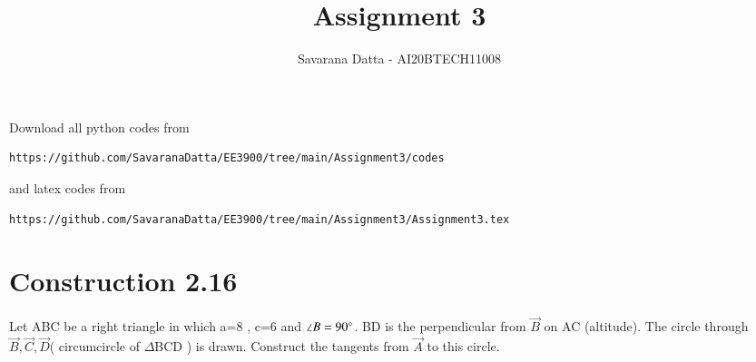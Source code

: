 \documentclass[journal,12pt,twocolumn]{IEEEtran}
\begin{document}
     \def\rightbox#1{\makebox[0in][r]{#1}}
     \def\centbox#1{\makebox[0in]{#1}}
     \def\topbox#1{\raisebox{-\baselineskip}[0in][0in]{#1}}
     \def\midbox#1{\raisebox{-0.5\baselineskip}[0in][0in]{#1}}
\vspace{3cm}
\title{ Assignment 3}
\author{Savarana Datta - AI20BTECH11008}
\maketitle
\newpage
\bigskip
\renewcommand{\thefigure}{\theenumi}
\renewcommand{\thetable}{\theenumi}
Download all python codes from 
\begin{lstlisting}
https://github.com/SavaranaDatta/EE3900/tree/main/Assignment3/codes
\end{lstlisting}
%
and latex codes from 
%
\begin{lstlisting}
https://github.com/SavaranaDatta/EE3900/tree/main/Assignment3/Assignment3.tex
\end{lstlisting}


\section{Construction 2.16}
Let ABC be a right triangle in which a=8 , c=6 and $\angle B = 90 \degree$. BD is the perpendicular from $\vec{B}$ on AC (altitude). The circle through $\vec{B},\vec{C},\vec{D}$( circumcircle of $\Delta$BCD ) is drawn. Construct the tangents from $\vec{A}$ to this circle.
\end{document}
